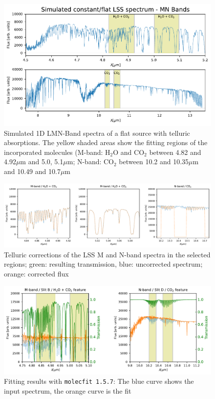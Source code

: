 \begin{figure}[ht]
  \centering
  \includegraphics[width=1.0\textwidth]{figures/LSS_CrtAlg_files/LSS_sim_spectra.pdf}
    \caption[Simulated spectra of a flat source with telluric absorptions]{%
        Simulated 1D LMN-Band spectra of a flat source with telluric absorptions. The yellow shaded areas show the fitting regions of the incorporated molecules (M-band: H$_2$O and CO$_2$ between 4.82 and 4.92$\mu$m and 5.0, 5.1$\mu$m; N-band: CO$_2$ between 10.2 and 10.35$\mu$m and 10.49 and 10.7$\mu$m}
  \label{Fig:lss_sim}
\end{figure}
\begin{figure}[ht]
  \centering
  \includegraphics[width=1.0\textwidth]{figures/LSS_CrtAlg_files/LSS_mf_details.pdf}
    \caption[Molecfit details]{%
        Telluric corrections of the \ac{LSS} M and N-band spectra in the selected regions; green: resulting transmission, blue: uncorrected spectrum; orange: corrected flux}
  \label{Fig:lss_results}
\end{figure}
\begin{figure}[ht]
  \centering
  \includegraphics[width=1.0\textwidth]{figures/LSS_CrtAlg_files/LSS_mf_results.pdf}
    \caption[Molecfit results]{%
        Fitting results with \texttt{molecfit 1.5.7}: The blue curve shows the input spectrum, the orange curve is the fit}
  \label{Fig:lss_corr}
\end{figure}

